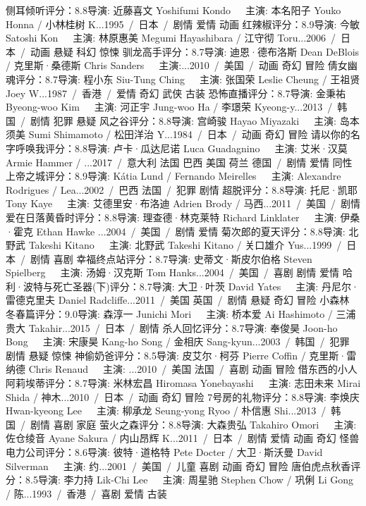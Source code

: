 侧耳倾听评分：8.8导演: 近藤喜文 Yoshifumi Kondo   主演: 本名阳子 Youko Honna / 小林桂树 K...1995 / 日本 / 剧情 爱情 动画
红辣椒评分：8.9导演: 今敏 Satoshi Kon   主演: 林原惠美 Megumi Hayashibara / 江守彻 Toru...2006 / 日本 / 动画 悬疑 科幻 惊悚
驯龙高手评分：8.7导演: 迪恩·德布洛斯 Dean DeBlois / 克里斯·桑德斯 Chris Sanders   主演:...2010 / 美国 / 动画 奇幻 冒险
倩女幽魂评分：8.7导演: 程小东 Siu-Tung Ching   主演: 张国荣 Leslie Cheung / 王祖贤 Joey W...1987 / 香港 / 爱情 奇幻 武侠 古装
恐怖直播评分：8.7导演: 金秉祐 Byeong-woo Kim   主演: 河正宇 Jung-woo Ha / 李璟荣 Kyeong-y...2013 / 韩国 / 剧情 犯罪 悬疑
风之谷评分：8.8导演: 宫崎骏 Hayao Miyazaki   主演: 岛本须美 Sumi Shimamoto / 松田洋治 Y...1984 / 日本 / 动画 奇幻 冒险
请以你的名字呼唤我评分：8.8导演: 卢卡·瓜达尼诺 Luca Guadagnino   主演: 艾米·汉莫 Armie Hammer / ...2017 / 意大利 法国 巴西 美国 荷兰 德国 / 剧情 爱情 同性
上帝之城评分：8.9导演: Kátia Lund / Fernando Meirelles   主演: Alexandre Rodrigues / Lea...2002 / 巴西 法国 / 犯罪 剧情
超脱评分：8.8导演: 托尼·凯耶 Tony Kaye   主演: 艾德里安·布洛迪 Adrien Brody / 马西...2011 / 美国 / 剧情
爱在日落黄昏时评分：8.8导演: 理查德·林克莱特 Richard Linklater   主演: 伊桑·霍克 Ethan Hawke ...2004 / 美国 / 剧情 爱情
菊次郎的夏天评分：8.8导演: 北野武 Takeshi Kitano   主演: 北野武 Takeshi Kitano / 关口雄介 Yus...1999 / 日本 / 剧情 喜剧
幸福终点站评分：8.7导演: 史蒂文·斯皮尔伯格 Steven Spielberg   主演: 汤姆·汉克斯 Tom Hanks...2004 / 美国 / 喜剧 剧情 爱情
哈利·波特与死亡圣器(下)评分：8.7导演: 大卫·叶茨 David Yates   主演: 丹尼尔·雷德克里夫 Daniel Radcliffe...2011 / 美国 英国 / 剧情 悬疑 奇幻 冒险
小森林 冬春篇评分：9.0导演: 森淳一 Junichi Mori   主演: 桥本爱 Ai Hashimoto / 三浦贵大 Takahir...2015 / 日本 / 剧情
杀人回忆评分：8.7导演: 奉俊昊 Joon-ho Bong   主演: 宋康昊 Kang-ho Song / 金相庆 Sang-kyun...2003 / 韩国 / 犯罪 剧情 悬疑 惊悚
神偷奶爸评分：8.5导演: 皮艾尔·柯芬 Pierre Coffin / 克里斯·雷纳德 Chris Renaud   主演: ...2010 / 美国 法国 / 喜剧 动画 冒险
借东西的小人阿莉埃蒂评分：8.7导演: 米林宏昌 Hiromasa Yonebayashi   主演: 志田未来 Mirai Shida / 神木...2010 / 日本 / 动画 奇幻 冒险
7号房的礼物评分：8.8导演: 李焕庆 Hwan-kyeong Lee   主演: 柳承龙 Seung-yong Ryoo / 朴信惠 Shi...2013 / 韩国 / 剧情 喜剧 家庭
萤火之森评分：8.8导演: 大森贵弘 Takahiro Omori   主演: 佐仓绫音 Ayane Sakura / 内山昂辉 K...2011 / 日本 / 剧情 爱情 动画 奇幻
怪兽电力公司评分：8.6导演: 彼特·道格特 Pete Docter / 大卫·斯沃曼 David Silverman   主演: 约...2001 / 美国 / 儿童 喜剧 动画 奇幻 冒险
唐伯虎点秋香评分：8.5导演: 李力持 Lik-Chi Lee   主演: 周星驰 Stephen Chow / 巩俐 Li Gong / 陈...1993 / 香港 / 喜剧 爱情 古装
